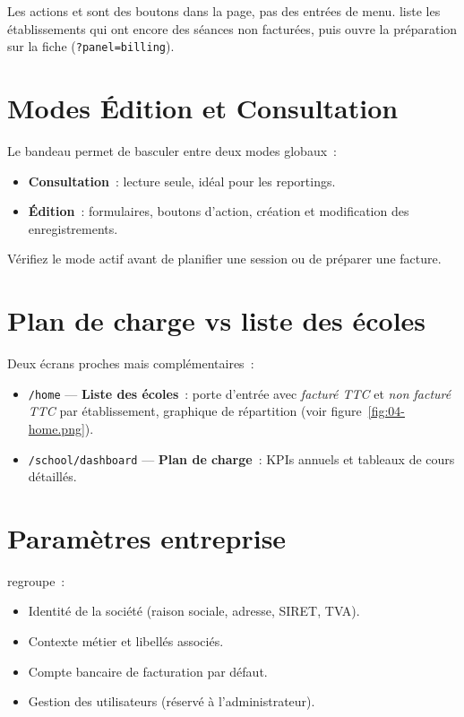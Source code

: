 Les actions  et  sont des boutons dans la page, pas des entrées de menu.
 liste les établissements qui ont encore des séances non facturées, puis ouvre la préparation sur la fiche (\texttt{?panel=billing}).

\section{Modes Édition et Consultation}

Le bandeau permet de basculer entre deux modes globaux~:

\begin{itemize}[leftmargin=*]
  \item \textbf{Consultation}~: lecture seule, idéal pour les reportings.
  \item \textbf{Édition}~: formulaires, boutons d'action, création et modification des enregistrements.
\end{itemize}

Vérifiez le mode actif avant de planifier une session ou de préparer une facture.

\section{Plan de charge vs liste des écoles}

Deux écrans proches mais complémentaires~:

\begin{itemize}[leftmargin=*]
  \item \texttt{/home} — \textbf{Liste des écoles}~: porte d'entrée avec \emph{facturé TTC} et \emph{non facturé TTC} par établissement, graphique de répartition (voir figure~\ref{fig:04-home.png}).
  \item \texttt{/school/dashboard} — \textbf{Plan de charge}~: KPIs annuels et tableaux de cours détaillés.
\end{itemize}

\section{Paramètres entreprise}

 regroupe~:

\begin{itemize}[leftmargin=*]
  \item Identité de la société (raison sociale, adresse, SIRET, TVA).
  \item Contexte métier et libellés associés.
  \item Compte bancaire de facturation par défaut.
  \item Gestion des utilisateurs (réservé à l'administrateur).
\end{itemize}


